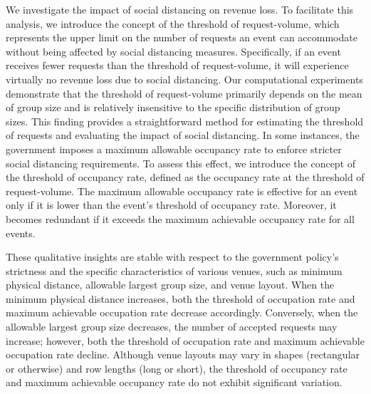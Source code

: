 We investigate the impact of social distancing on revenue loss. To facilitate this analysis, we introduce the concept of the threshold of request-volume, which represents the upper limit on the number of requests an event can accommodate without being affected by social distancing measures. Specifically, if an event receives fewer requests than the threshold of request-volume, it will experience virtually no revenue loss due to social distancing. Our computational experiments demonstrate that the threshold of request-volume primarily depends on the mean of group size and is relatively insensitive to the specific distribution of group sizes. This finding provides a straightforward method for estimating the threshold of requests and evaluating the impact of social distancing.
In some instances, the government imposes a maximum allowable occupancy rate to enforce stricter social distancing requirements. To assess this effect, we introduce the concept of the threshold of occupancy rate, defined as the occupancy rate at the threshold of request-volume. The maximum allowable occupancy rate is effective for an event only if it is lower than the event's threshold of occupancy rate. Moreover, it becomes redundant if it exceeds the maximum achievable occupancy rate for all events.




These qualitative insights are stable with respect to the government policy's strictness and the specific characteristics of various venues, such as minimum physical distance, allowable largest group size, and venue layout. When the minimum physical distance increases, both the threshold of occupation rate and maximum achievable occupation rate decrease accordingly. Conversely, when the allowable largest group size decreases, the number of accepted requests may increase; however, both the threshold of occupation rate and maximum achievable occupation rate decline. Although venue layouts may vary in shapes (rectangular or otherwise) and row lengths (long or short), the threshold of occupancy rate and maximum achievable occupancy rate do not exhibit significant variation.


